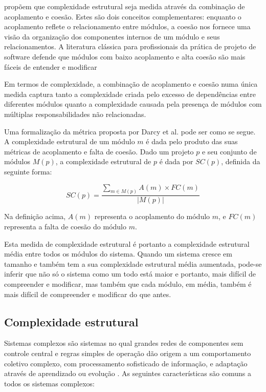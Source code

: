 \begin{itemize}
 propõem que
complexidade estrutural seja medida através da combinação de acoplamento
e coesão. Estes são dois conceitos complementares: enquanto o
acoplamento reflete o relacionamento entre módulos, a coesão nos fornece
uma visão da organização dos componentes internos de um módulo e seus
relacionamentos.  A literatura clássica para profissionais da prática de
projeto de software defende que módulos com baixo acoplamento e alta
coesão são mais fáceis de entender e modificar %

Em termos de complexidade, a combinação de acoplamento e coesão numa
única medida captura tanto a complexidade criada pelo excesso de
dependências entre diferentes módulos quanto a complexidade causada pela
presença de módulos com múltiplas responsabilidades não relacionadas.

Uma formalização da métrica proposta por Darcy et al.
\cite{Darcy2005} pode ser como se segue. A complexidade estrutural de um
módulo $m$ é dada pelo produto das suas métricas de acoplamento e falta
de coesão. Dado um projeto $p$ e seu conjunto de módulos $M(p)$, a
complexidade estrutural de $p$ é dada por $SC(p)$, definida da seguinte
forma:

\[
SC(p) =
\frac
{\displaystyle\sum_{m \in M(p)}A(m) \times FC(m)}
{ |M(p)| }
\]

Na definição acima, $A(m)$ representa o acoplamento do módulo $m$, e
$FC(m)$ representa a falta de coesão do módulo $m$.

Esta medida de complexidade estrutural é portanto a complexidade
estrutural média entre todos os módulos do sistema. Quando um sistema
cresce em tamanho e também tem a sua complexidade estrutural média
aumentada, pode-se inferir que não só o sistema como um todo está maior
e portanto, mais difícil de compreender e modificar, mas também que cada
módulo, em média, também é mais difícil de compreender e modificar do
que antes.

\end{itemize}

\subsection{Complexidade estrutural} \label{complexidade}

Sistemas complexos são sistemas no qual grandes redes de componentes sem
controle central e regras simples de operação dão origem a um comportamento
coletivo complexo, com processamento sofisticado de informação, e adaptação através
de aprendizado ou evolução \cite{Mitchell2009}. As seguintes características
são comuns a todos os sistemas complexos:


